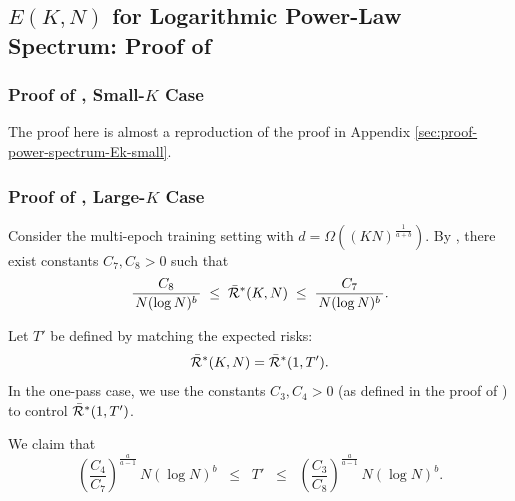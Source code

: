 \subsection{$E(K,N)$ for Logarithmic Power-Law Spectrum: Proof of } \label{sec:proof-one-hot-Ek-log-power-spectrum}
\subsubsection{Proof of , Small-$K$ Case}The proof here is almost a reproduction of the proof in Appendix \ref{sec:proof-power-spectrum-Ek-small}.
\subsubsection{Proof of , Large-$K$ Case}

Consider the multi-epoch training setting with $d=\Omega\left(\left(KN\right)^{\frac{1}{a+b}}\right)$.
By , there exist constants $C_7,C_8>0$ such that
\begin{equation}\label{eq:ME-two-sided}
\frac{C_8}{\,N(\log N)^b\,}
\;\le\;
\Bar{\mathcal{R}}^*(K,N)
\;\le\;
\frac{C_7}{\,N(\log N)^b\,}.
\end{equation}

Let $T'$ be defined by matching the expected risks:
\begin{equation}\label{eq:ME-equal-risk}
\Bar{\mathcal{R}}^*(K,N)=\Bar{\mathcal{R}}^*(1,T').
\end{equation}
In the one-pass case, we use the constants $C_3,C_4>0$ (as defined in the proof of ) to control $\Bar{\mathcal{R}}^*(1,T')$.

We claim that
\begin{equation}\label{eq:ME-Tprime-band}
\left(\frac{C_4}{C_7}\right)^{\!\frac{a}{a-1}}\,
N(\log N)^b
\;\;\le\;\;
T'
\;\;\le\;\;
\left(\frac{C_3}{C_8}\right)^{\!\frac{a}{a-1}}\,
N(\log N)^b .
\end{equation}

